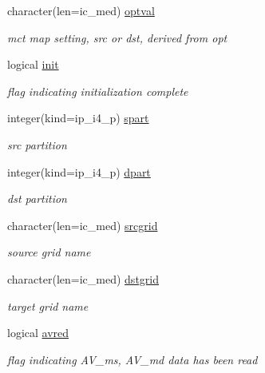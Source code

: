 \begin{DoxyCompactItemize}
character(len=ic\+\_\+med) \hyperlink{structmod__oasis__map_1_1prism__mapper__type_ad1516b48d26a0cf57a3c61c58298aa09}{optval}
\begin{DoxyCompactList}\small\item\em mct map setting, src or dst, derived from opt \end{DoxyCompactList}\item 
logical \hyperlink{structmod__oasis__map_1_1prism__mapper__type_aebd50312a6d63fb217231d7cb43cdf65}{init}
\begin{DoxyCompactList}\small\item\em flag indicating initialization complete \end{DoxyCompactList}\item 
integer(kind=ip\+\_\+i4\+\_\+p) \hyperlink{structmod__oasis__map_1_1prism__mapper__type_a26d7374d018e7d5b5b87d91eef9e02a9}{spart}
\begin{DoxyCompactList}\small\item\em src partition \end{DoxyCompactList}\item 
integer(kind=ip\+\_\+i4\+\_\+p) \hyperlink{structmod__oasis__map_1_1prism__mapper__type_a8a597bf1362ebd82c03fdd6ac887620e}{dpart}
\begin{DoxyCompactList}\small\item\em dst partition \end{DoxyCompactList}\item 
character(len=ic\+\_\+med) \hyperlink{structmod__oasis__map_1_1prism__mapper__type_a8d90dd5fc6b4f86705bf1dbe1391a8a3}{srcgrid}
\begin{DoxyCompactList}\small\item\em source grid name \end{DoxyCompactList}\item 
character(len=ic\+\_\+med) \hyperlink{structmod__oasis__map_1_1prism__mapper__type_a279bf3df7b5f87eec6e1b2ffdce3e5b1}{dstgrid}
\begin{DoxyCompactList}\small\item\em target grid name \end{DoxyCompactList}\item 
logical \hyperlink{structmod__oasis__map_1_1prism__mapper__type_a270d69de9108f210fedbc3871d8a7a15}{avred}
\begin{DoxyCompactList}\small\item\em flag indicating A\+V\+\_\+ms, A\+V\+\_\+md data has been read \end{DoxyCompactList}\item 

\end{DoxyCompactItemize}

